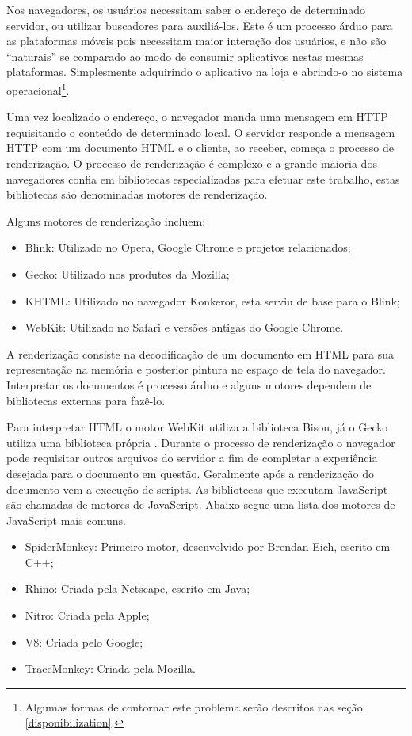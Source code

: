 Nos navegadores, os usuários necessitam saber o endereço de determinado
servidor, ou utilizar buscadores para auxiliá-los. Este é um processo
árduo para as plataformas móveis pois necessitam maior interação
dos usuários, e não são “naturais” se comparado ao modo de
consumir aplicativos nestas mesmas plataformas. Simplesmente adquirindo
o aplicativo na loja e abrindo-o no sistema operacional\footnote{Algumas
formas de contornar este problema serão descritos nas seção
\ref{disponibilization}.}.

Uma vez localizado o endereço, o navegador manda uma mensagem em HTTP
requisitando o conteúdo de determinado local. O servidor responde a
mensagem HTTP com um documento HTML e o cliente, ao receber, começa o
processo de renderização. O processo de renderização é complexo e a
grande maioria dos navegadores confia em bibliotecas especializadas para
efetuar este trabalho, estas bibliotecas são denominadas motores de renderização.

Alguns motores de renderização incluem:

\begin{itemize}
    \item Blink: Utilizado no Opera, Google Chrome e projetos relacionados;
    \item Gecko: Utilizado nos produtos da Mozilla;
    \item KHTML: Utilizado no navegador Konkeror, esta serviu de base para o Blink;
    \item WebKit: Utilizado no Safari e versões antigas do Google Chrome.
\end{itemize}

A renderização consiste na decodificação de um documento em HTML
para sua representação na memória e posterior pintura no espaço de tela
do navegador. Interpretar os documentos é processo árduo e alguns
motores dependem de bibliotecas externas para fazê-lo. 

Para interpretar HTML o motor WebKit utiliza a biblioteca Bison, já
o Gecko utiliza uma biblioteca própria \autocite{howBrowsersWork}.
Durante o processo de renderização o navegador pode requisitar outros
arquivos do servidor a fim de completar a experiência desejada para o
documento em questão. Geralmente após a renderização do documento
vem a execução de scripts. As bibliotecas que executam JavaScript são
chamadas de motores de JavaScript. Abaixo segue uma lista dos motores de
JavaScript mais comuns.

\begin{itemize}
    \item SpiderMonkey: Primeiro motor, desenvolvido por Brendan Eich, escrito em C++;
    \item Rhino: Criada pela Netscape, escrito em Java;
    \item Nitro: Criada pela Apple;
    \item V8: Criada pelo Google;
    \item TraceMonkey: Criada pela Mozilla.
\end{itemize}

